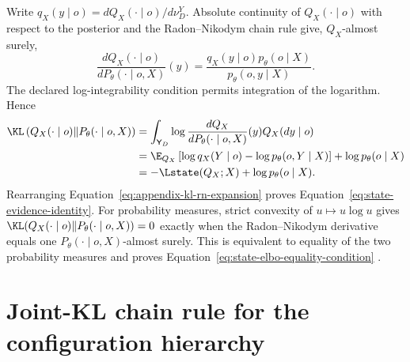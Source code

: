 Write \(q_X(y\mid o)=dQ_X(\mathord\cdot\mid o)/d\nu_D^Y\). Absolute continuity of \(Q_X(\mathord\cdot\mid o)\) with respect to the posterior and the Radon--Nikodym chain rule give, \(Q_X\)-almost surely,
\begin{equation}
\frac{dQ_X(\mathord\cdot\mid o)}
{dP_\theta(\mathord\cdot\mid o,X)}(y)
=\frac{q_X(y\mid o)p_\theta(o\mid X)}
{p_\theta(o,y\mid X)}.
\label{eq:appendix-radon-nikodym-ratio}
\end{equation}
The declared log-integrability condition permits integration of the logarithm. Hence
\begin{align}
\KL\left(
Q_X(\mathord\cdot\mid o)
\middle\Vert
P_\theta(\mathord\cdot\mid o,X)
\right)
&=\int_{\mathsf Y_D}
\log\frac{dQ_X}{dP_\theta(\mathord\cdot\mid o,X)}(y)
Q_X(dy\mid o)
\label{eq:appendix-kl-rn-expansion}\\
&=\E_{Q_X}\left[
\log q_X(Y\mid o)-\log p_\theta(o,Y\mid X)
\right]
+\log p_\theta(o\mid X)\notag\\
&=-\Lstate(Q_X;X)+\log p_\theta(o\mid X).\notag
\end{align}
Rearranging Equation~\eqref{eq:appendix-kl-rn-expansion} proves Equation~\eqref{eq:state-evidence-identity}. For probability measures, strict convexity of \(u\mapsto u\log u\) gives
\(\KL(Q_X(\mathord\cdot\mid o)\Vert P_\theta(\mathord\cdot\mid o,X))=0\) exactly when the Radon--Nikodym derivative equals one \(P_\theta(\mathord\cdot\mid o,X)\)-almost surely. This is equivalent to equality of the two probability measures and proves Equation~\eqref{eq:state-elbo-equality-condition} \citep{Kullback1951,Csiszar1967}.

\section{Joint-KL chain rule for the configuration hierarchy}
\label{sec:hierarchical-joint-kl-proof}

